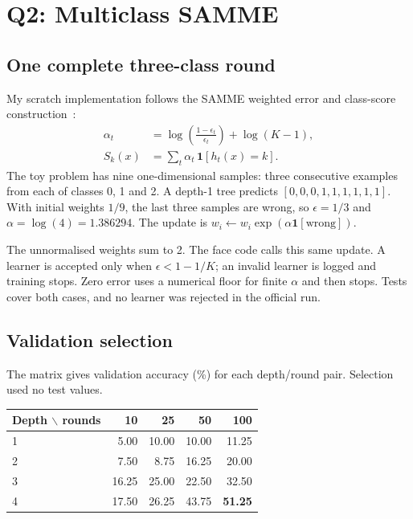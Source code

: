 \documentclass[10pt,twocolumn,letterpaper]{article}
\begin{document}
\clearpage
\section{Q2: Multiclass SAMME}
\subsection{One complete three-class round}
My scratch implementation follows the SAMME weighted error and class-score construction~\cite{zhu2009}:
\begin{align}
\alpha_t &= \log\!\left(\frac{1-\epsilon_t}{\epsilon_t}\right)+\log(K-1),\\
S_k(x) &= \sum_t \alpha_t\,\mathbf{1}[h_t(x)=k].
\end{align}
The toy problem has nine one-dimensional samples: three consecutive examples from each of classes 0, 1 and 2. A depth-1 tree predicts $[0,0,0,1,1,1,1,1,1]$. With initial weights $1/9$, the last three samples are wrong, so $\epsilon=1/3$ and $\alpha=\log(4)=1.386294$. The update is $w_i\leftarrow w_i\exp(\alpha\mathbf{1}[\mathrm{wrong}])$.

\begin{table}[h]
\centering\scriptsize
{}
\end{table}

The unnormalised weights sum to 2. The face code calls this same update. A learner is accepted only when $\epsilon<1-1/K$; an invalid learner is logged and training stops. Zero error uses a numerical floor for finite $\alpha$ and then stops. Tests cover both cases, and no learner was rejected in the official run.

\subsection{Validation selection}
The matrix gives validation accuracy (\%) for each depth/round pair. Selection used no test values.

\begin{table}[h]
\centering\scriptsize
\begin{tabular}{lrrrr}
\toprule
Depth $\backslash$ rounds & 10 & 25 & 50 & 100 \\
\midrule
1 & 5.00 & 10.00 & 10.00 & 11.25 \\
2 & 7.50 & 8.75 & 16.25 & 20.00 \\
3 & 16.25 & 25.00 & 22.50 & 32.50 \\
4 & 17.50 & 26.25 & 43.75 & \textbf{51.25} \\
\bottomrule
\end{tabular}
\end{table}
\end{document}
